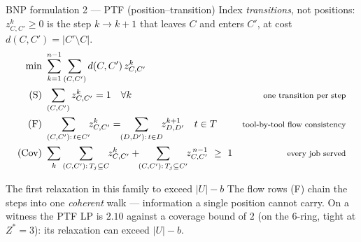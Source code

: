 \documentclass[10pt]{beamer}
\newcommand{\U}{U}\newcommand{\Kst}{K^{\ast}}\newcommand{\Zst}{Z^{\ast}}
\newcommand{\cov}{\lvert\U\rvert-b}
\begin{document}
\begin{frame}{BNP formulation 2 --- PTF (position--transition)}
Index \emph{transitions}, not positions: $z_{C,C'}^{k}\ge0$ is the step
$k\!\to\!k\!+\!1$ that leaves $C$ and enters $C'$, at cost $d(C,C')=|C'\setminus C|$.
\[
\begin{aligned}
  \min\ & \sum_{k=1}^{n-1}\sum_{(C,C')} d(C,C')\,z_{C,C'}^{k}\\
  \text{(S)}\ & \sum_{(C,C')} z_{C,C'}^{k}=1 \quad \forall k
  &\text{\footnotesize one transition per step}\\
  \text{(F)}\ & \sum_{(C,C'):\,t\in C'} \!\! z_{C,C'}^{k}
                =\!\!\sum_{(D,D'):\,t\in D}\!\! z_{D,D'}^{k+1} \quad t\in T
  &\text{\footnotesize tool-by-tool flow consistency}\\
  \text{(Cov)}\ & \sum_{k}\sum_{(C,C'):\,T_j\subseteq C}\!\! z_{C,C'}^{k}
                 +\!\!\sum_{(C,C'):\,T_j\subseteq C'}\!\! z_{C,C'}^{\,n-1}\ \ge\ 1
  &\text{\footnotesize every job served}
\end{aligned}
\]
\begin{alertblock}{The first relaxation in this family to exceed $\cov$}
The flow rows (F) chain the steps into one \emph{coherent} walk --- information a single
position cannot carry. On a witness the PTF LP is $2.10$ against a coverage bound of $2$
(on the $6$-ring, tight at $\Zst=3$): its relaxation can exceed $\cov$.
\end{alertblock}
\end{frame}
\end{document}
